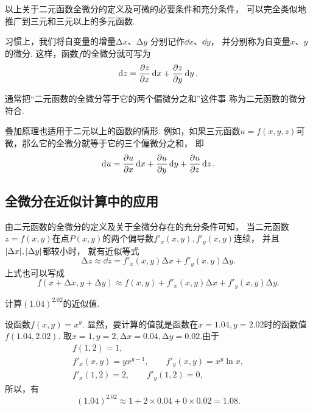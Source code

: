 以上关于二元函数全微分的定义及可微的必要条件和充分条件，
可以完全类似地推广到三元和三元以上的多元函数.

习惯上，我们将自变量的增量\(\increment x\)、\(\increment y\)
分别记作\(\dd{x}\)、\(\dd{y}\)，
并分别称为自变量\(x\)、\(y\)的微分.
这样，函数\(f\)的全微分就可写为\begin{equation*}
	\dd{z}=\pdv{z}{x}\dd{x}+\pdv{z}{y}\dd{y}.
\end{equation*}

通常把“二元函数的全微分等于它的两个偏微分之和”这件事
称为二元函数的微分符合.

叠加原理也适用于二元以上的函数的情形.
例如，如果三元函数\(u = f(x,y,z)\)可微，那么它的全微分就等于它的三个偏微分之和，
即\begin{equation*}
	\dd{u} = \pdv{u}{x} \dd{x} + \pdv{u}{y} \dd{y} + \pdv{u}{z} \dd{z}.
\end{equation*}

\subsection{全微分在近似计算中的应用}
由二元函数的全微分的定义及关于全微分存在的充分条件可知，
当二元函数\(z = f(x,y)\)在点\(P(x,y)\)的两个偏导数\(f'_x(x,y),f'_y(x,y)\)连续，
并且\(\abs{\Delta x},\abs{\Delta y}\)都较小时，
就有近似等式\begin{equation*}
	\increment z \approx \dd{z} = f'_x(x,y) \increment x + f'_y(x,y) \increment y.
\end{equation*}
上式也可以写成\begin{equation*}
	f(x+\increment x,y+\increment y) \approx f(x,y) + f'_x(x,y) \increment x + f'_y(x,y) \increment y.
\end{equation*}

\begin{example}
计算\((1.04)^{2.02}\)的近似值.
\begin{solution}
设函数\(f(x,y) = x^y\).
显然，要计算的值就是函数在\(x=1.04,y=2.02\)时的函数值\(f(1.04,2.02)\).
取\(x=1,y=2,\increment x=0.04,\increment y=0.02\).由于\begin{gather*}
	f(1,2)=1, \\
	f'_x(x,y) = y x^{y-1}, \qquad f'_y(x,y) = x^y \ln x, \\
	f'_x(1,2) = 2, \qquad f'_y(1,2) = 0,
\end{gather*}
所以，有\begin{equation*}
	(1.04)^{2.02} \approx 1 + 2 \times 0.04 + 0 \times 0.02 = 1.08.
\end{equation*}
\end{solution}
\end{example}

